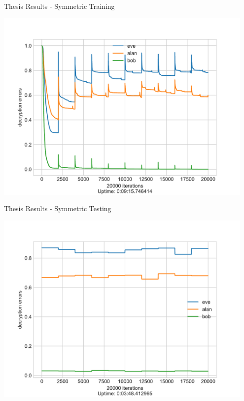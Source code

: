 \documentclass[a4paper, 12pt]{report}
\begin{document}
\begin{blockfigure}{Thesis Results - Symmetric Training}
	\begin{center}
		\includegraphics[width = 0.95\textwidth]{neurencoder-symmetric-training}
	\end{center}
\end{blockfigure}
\begin{blockfigure}{Thesis Results - Symmetric Testing}
	\begin{center}
		\includegraphics[width = 0.95\textwidth]{neurencoder-symmetric-testing}
	\end{center}
\end{blockfigure}
\newpage
\end{document}
